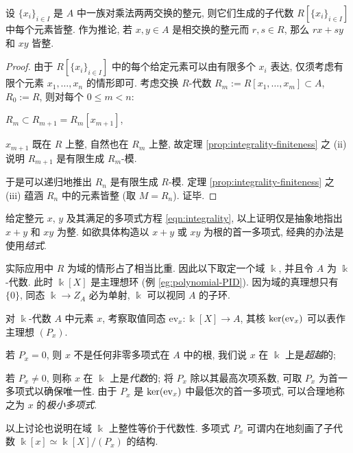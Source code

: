 \begin{corollary}\label{prop:integrality-compositum}
	设 $\{x_i\}_{i \in I}$ 是 $A$ 中一族对乘法两两交换的整元, 则它们生成的子代数 $R[\{x_i\}_{i \in I}]$ 中每个元素皆整. 作为推论, 若 $x, y \in A$ 是相交换的整元而 $r,s \in R$, 那么 $rx + sy$ 和 $xy$ 皆整.
\end{corollary}
\begin{proof}
	由于 $R[\{x_i\}_{i \in I}]$ 中的每个给定元素可以由有限多个 $x_i$ 表达, 仅须考虑有限个元素 $x_1, \ldots, x_n$ 的情形即可. 考虑交换 $R$-代数 $R_m := R[x_1, \ldots, x_m] \subset A$, $R_0 := R$, 则对每个 $0 \leq m < n$:
	\begin{compactitem}
		\item $R_m \subset R_{m+1} = R_m[x_{m+1}]$,
		\item $x_{m+1}$ 既在 $R$ 上整, 自然也在 $R_m$ 上整, 故定理 \ref{prop:integrality-finiteness} 之 (ii) 说明 $R_{m+1}$ 是有限生成 $R_m$-模.
	\end{compactitem}
	于是可以递归地推出 $R_n$ 是有限生成 $R$-模. 定理 \ref{prop:integrality-finiteness} 之 (iii) 蕴涵 $R_n$ 中的元素皆整 (取 $M = R_n$). 证毕.
\end{proof}
\begin{remark}
	给定整元 $x$, $y$ 及其满足的多项式方程 \eqref{eqn:integrality}, 以上证明仅是抽象地指出 $x + y$ 和 $xy$ 为整. 如欲具体构造以 $x+y$ 或 $xy$ 为根的首一多项式, 经典的办法是使用\emph{结式}.
\end{remark}

实际应用中 $R$ 为域的情形占了相当比重. 因此以下取定一个域 $\Bbbk$, 并且令 $A$ 为 $\Bbbk$-代数. 此时 $\Bbbk[X]$ 是主理想环 (例 \ref{eg:polynomial-PID}). 因为域的真理想只有 $\{0\}$, 同态 $\Bbbk \to Z_A$ 必为单射, $\Bbbk$ 可以视同 $A$ 的子环.

\begin{definition}\label{def:algebraic-element}
	对 $\Bbbk$-代数 $A$ 中元素 $x$, 考察取值同态 $\text{ev}_x: \Bbbk[X] \to A$, 其核 $\operatorname{ker}(\text{ev}_x)$ 可以表作主理想 $(P_x)$.
	\begin{compactitem}
		\item 若 $P_x = 0$, 则 $x$ 不是任何非零多项式在 $A$ 中的根, 我们说 $x$ 在 $\Bbbk$ 上是\emph{超越}的;
		\item 若 $P_x \neq 0$, 则称 $x$ 在 $\Bbbk$ 上是\emph{代数}的; 将 $P_x$ 除以其最高次项系数, 可取 $P_x$ 为首一多项式以确保唯一性. 由于 $P_x$ 是 $\operatorname{ker}(\text{ev}_x)$ 中最低次的首一多项式, 可以合理地称之为 $x$ 的\emph{极小多项式}.  
	\end{compactitem}
\end{definition}
以上讨论也说明在域 $\Bbbk$ 上整性等价于代数性. 多项式 $P_x$ 可谓内在地刻画了子代数 $\Bbbk[x] \simeq \Bbbk[X]/(P_x)$ 的结构.

